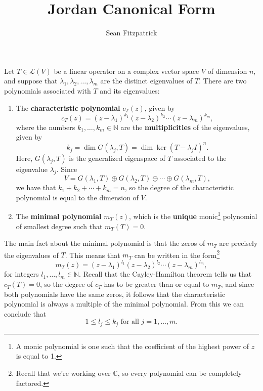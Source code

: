 \documentclass[12pt,letterpaper]{article}
\author{Sean Fitzpatrick}
\title{Jordan Canonical Form}
\theoremstyle{definition}
\renewcommand{\L}{\mathcal{L}}
\begin{document}
\maketitle

Let $T\in\L(V)$ be a linear operator on a complex vector space $V$ of dimension $n$, and suppose that $\lambda_1,\lambda_2,\ldots, \lambda_m$ are the distinct eigenvalues of $T$. There are two polynomials associated with $T$ and its eigenvalues:

\begin{enumerate}
 \item The {\bf characteristic polynomial} $c_T(z)$, given by 
\[
 c_T(z)=(z-\lambda_1)^{k_1}(z-\lambda_2)^{k_2}\cdots(z-\lambda_m)^{k_m},
\]
where the numbers $k_1,\ldots, k_m\in\mathbb{N}$ are the {\bf multiplicities} of the eigenvalues, given by
\[
 k_j = \dim G(\lambda_j,T) = \dim \ker (T-\lambda_j I)^n.
\]
Here, $G(\lambda_j,T)$ is the generalized eigenspace of $T$ associated to the eigenvalue $\lambda_j$. Since 
\[
 V=G(\lambda_1,T)\oplus G(\lambda_2,T)\oplus\cdots\oplus G(\lambda_m,T),
\]
we have that $k_1+k_2+\cdots +k_m = n$, so the degree of the characteristic polynomial is equal to the dimension of $V$.

 \item The {\bf minimal polynomial} $m_T(z)$, which is the {\bf unique} monic\footnote{A monic polynomial is one such that the coefficient of the highest power of $z$ is equal to 1.} polynomial of smallest degree such that $m_T(T)=0$.

\end{enumerate}
The main fact about the minimal polynomial is that the zeros of $m_T$ are precisely the eigenvalues of $T$. This means that $m_T$ can be written in the form\footnote{Recall that we're working over $\mathbb{C}$, so every polynomial can be completely factored.}
\[
 m_T(z) = (z-\lambda_1)^{l_1}(z-\lambda_2)^{l_2}\cdots (z-\lambda_m)^{l_m},
\]
for integers $l_1,\ldots, l_m\in \mathbb{N}$. Recall that the Cayley-Hamilton theorem tells us that $c_T(T)=0$, so the degree of $c_T$ has to be greater than or equal to $m_T$, and since both polynomials have the same zeros, it follows that the characteristic polynomial is always a multiple of the minimal polynomial. From this we can conclude that
\[
 1\leq l_j\leq k_j \text{ for all } j=1,\ldots, m.
\]
\end{document}

